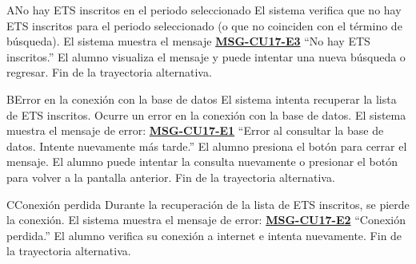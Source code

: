 \begin{UCtrayectoriaA}{A}{No hay ETS inscritos en el periodo seleccionado}
	\UCpaso El sistema verifica que no hay ETS inscritos para el periodo seleccionado (o que no coinciden con el término de búsqueda).
	\UCpaso El sistema muestra el mensaje \textbf{\hyperref[msg:CU17-E3]{MSG-CU17-E3}} ``No hay ETS inscritos.''
	\UCpaso[\UCactor] El alumno visualiza el mensaje y puede intentar una nueva búsqueda o regresar.
	\UCpaso Fin de la trayectoria alternativa.
\end{UCtrayectoriaA}

\begin{UCtrayectoriaA}{B}{Error en la conexión con la base de datos}
	\UCpaso El sistema intenta recuperar la lista de ETS inscritos.
	\UCpaso Ocurre un error en la conexión con la base de datos.
	\UCpaso El sistema muestra el mensaje de error: \textbf{\hyperref[msg:CU17-E1]{MSG-CU17-E1}} ``Error al consultar la base de datos. Intente nuevamente más tarde.''
	\UCpaso[\UCactor] El alumno presiona el botón  para cerrar el mensaje.
	\UCpaso[\UCactor] El alumno puede intentar la consulta nuevamente o presionar el botón  para volver a la pantalla anterior.
	\UCpaso Fin de la trayectoria alternativa.
\end{UCtrayectoriaA}

\begin{UCtrayectoriaA}{C}{Conexión perdida}
	\UCpaso Durante la recuperación de la lista de ETS inscritos, se pierde la conexión.
	\UCpaso El sistema muestra el mensaje de error: \textbf{\hyperref[msg:CU17-E2]{MSG-CU17-E2}} ``Conexión perdida.''
	\UCpaso[\UCactor] El alumno verifica su conexión a internet e intenta nuevamente.
	\UCpaso Fin de la trayectoria alternativa.
\end{UCtrayectoriaA}

